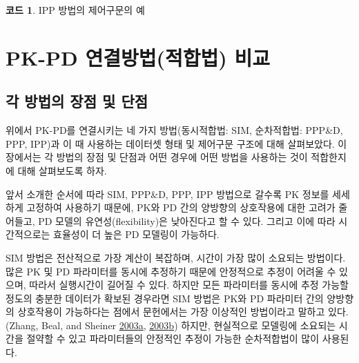 \documentclass[
  10pt,
  krantz2,
  a4paper]{krantz}
\theoremstyle{definition}
\theoremstyle{definition}
\newtheorem{example}{코드}[chapter]
\theoremstyle{definition}
\theoremstyle{remark}
\begin{document}
\begin{example}
\protect\hypertarget{exm:ipp-control-stream}{}{\label{exm:ipp-control-stream} }IPP 방법의 제어구문의 예
\end{example}

\hypertarget{pk-pd-uxc5f0uxacb0uxbc29uxbc95uxc801uxd569uxbc95-uxbe44uxad50}{%
\section{PK-PD 연결방법(적합법) 비교}\label{pk-pd-uxc5f0uxacb0uxbc29uxbc95uxc801uxd569uxbc95-uxbe44uxad50}}

\hypertarget{uxac01-uxbc29uxbc95uxc758-uxc7a5uxc810-uxbc0f-uxb2e8uxc810}{%
\subsection{각 방법의 장점 및 단점}\label{uxac01-uxbc29uxbc95uxc758-uxc7a5uxc810-uxbc0f-uxb2e8uxc810}}

위에서 PK-PD를 연결시키는 네 가지 방법(동시적합법: SIM, 순차적합법: PPP\&D, PPP, IPP)과 이 때 사용하는 데이터셋 형태 및 제어구문 구조에 대해 살펴보았다. 이 장에서는 각 방법의 장점 및 단점과 어떤 경우에 어떤 방법을 사용하는 것이 적합한지에 대해 살펴보도록 하자.

앞서 소개한 순서에 따라 SIM, PPP\&D, PPP, IPP 방법으로 갈수록 PK 정보를 세세하게 고정하여 사용하기 때문에, PK와 PD 간의 양방향의 상호작용에 대한 고려가 줄어들고, PD 모델의 유연성(flexibility)은 낮아진다고 할 수 있다. 그리고 이에 따라 시간적으로는 효율성이 더 높은 PD 모델링이 가능하다.

SIM 방법은 전산적으로 가장 계산이 복잡하며, 시간이 가장 많이 소요되는 방법이다. 많은 PK 및 PD 파라미터를 동시에 추정하기 때문에 안정적으로 추정이 어려울 수 있으며, 따라서 실행시간이 길어질 수 있다. 하지만 모든 파라미터를 동시에 추정 가능할 정도의 충분한 데이터가 확보된 경우라면 SIM 방법은 PK와 PD 파라미터 간의 양방향의 상호작용이 가능하다는 점에서 문헌에서는 가장 이상적인 방법이라고 말하고 있다. (Zhang, Beal, and Sheiner \protect\hyperlink{ref-zhang1}{2003}\protect\hyperlink{ref-zhang1}{a}, \protect\hyperlink{ref-zhang2}{2003}\protect\hyperlink{ref-zhang2}{b}) 하지만, 현실적으로 모델링에 소요되는 시간을 절약할 수 있고 파라미터들의 안정적인 추정이 가능한 순차적합법이 많이 사용된다.
\end{document}
